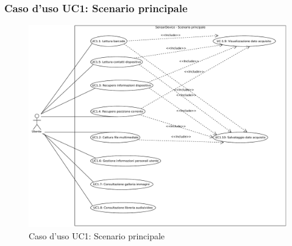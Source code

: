 \subsubsection{Caso d'uso UC1: Scenario principale}
\begin{figure}[htb]
\centering
\includegraphics[scale=0.45]{gfx/useCase/SD_UC1_Scenario_principale.pdf}
\caption{Caso d'uso UC1: Scenario principale}
\label{fig:UC1}
\end{figure}

